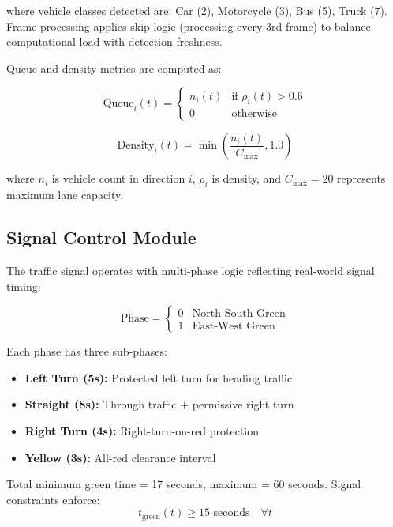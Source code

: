 \documentclass[10pt,conference]{IEEEtran}
\begin{document}
where vehicle classes detected are: Car (2), Motorcycle (3), Bus (5), Truck (7). Frame processing applies skip logic (processing every 3rd frame) to balance computational load with detection freshness.

Queue and density metrics are computed as:

\begin{equation}
\text{Queue}_{i}(t) = \begin{cases}
n_i(t) & \text{if } \rho_i(t) > 0.6 \\
0 & \text{otherwise}
\end{cases}
\end{equation}

\begin{equation}
\text{Density}_{i}(t) = \min\left(\frac{n_i(t)}{C_{\max}}, 1.0\right)
\end{equation}

where $n_i$ is vehicle count in direction $i$, $\rho_i$ is density, and $C_{\max} = 20$ represents maximum lane capacity.

\subsection{Signal Control Module}

The traffic signal operates with multi-phase logic reflecting real-world signal timing:

\begin{equation}
\text{Phase} = \begin{cases}
0 & \text{North-South Green} \\
1 & \text{East-West Green}
\end{cases}
\end{equation}

Each phase has three sub-phases:
\begin{itemize}
    \item \textbf{Left Turn (5s):} Protected left turn for heading traffic
    \item \textbf{Straight (8s):} Through traffic + permissive right turn
    \item \textbf{Right Turn (4s):} Right-turn-on-red protection
    \item \textbf{Yellow (3s):} All-red clearance interval
\end{itemize}

Total minimum green time = 17 seconds, maximum = 60 seconds. Signal constraints enforce:
\begin{equation}
t_{\text{green}}(t) \geq 15 \text{ seconds} \quad \forall t
\end{equation}
\end{document}
